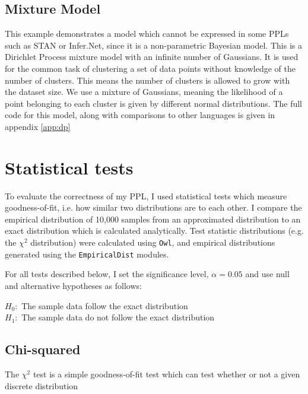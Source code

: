 \subsection{Mixture Model}
This example demonstrates a model which cannot be expressed in some PPLs such as STAN or Infer.Net, since it is a non-parametric Bayesian model. This is a Dirichlet Process mixture model with an infinite number of Gaussians\cite{dpmm}. It is used for the common task of clustering a set of data points without knowledge of the number of clusters. This means the number of clusters is allowed to grow with the dataset size. We use a mixture of Gaussians, meaning the likelihood of a point belonging to each cluster is given by different normal distributions. The full code for this model, along with comparisons to other languages is given in appendix \ref{app:dp}


\section{Statistical tests}
To evaluate the correctness of my PPL, I used statistical tests which measure goodness-of-fit, i.e. how similar two distributions are to each other. I compare the empirical distribution of 10,000 samples from an approximated distribution to an exact distribution which is calculated analytically. Test statistic distributions (e.g. the $\chi^2$ distribution) were calculated using \texttt{Owl}, and empirical distributions generated using the \texttt{EmpiricalDist} modules.

For all tests described below, I set the significance level, $\alpha = 0.05$ and use null and alternative hypotheses as follows:

$H_0:$ The sample data follow the exact distribution\\
$H_1:$ The sample data do not follow the exact distribution

\subsection{Chi-squared}

The $\chi^2$ test is a simple goodness-of-fit test which can test whether or not a given discrete distribution 

